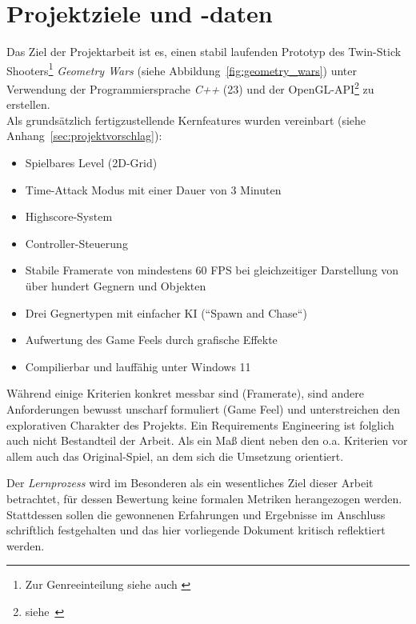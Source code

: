 \section{Projektziele und -daten}\label{sec:projektdaten}

Das Ziel der Projektarbeit ist es, einen stabil laufenden Prototyp des Twin-Stick Shooters\footnote{
Zur Genreeinteilung siehe auch \cite[]{GameDeveloper}
} \textit{Geometry Wars} (siehe Abbildung~\ref{fig:geometry_wars}) unter Verwendung der Programmiersprache \textit{C++} (23) und der OpenGL-API\footnote{siehe~\cite[]{OpenGLHomepage}
}  zu erstellen.\\

\noindent
Als grundsätzlich fertigzustellende Kernfeatures wurden vereinbart (siehe Anhang~\ref{sec:projektvorschlag}):

\vspace{2mm}
\begin{itemize}
    \itemsep0.5em
    \item Spielbares Level (2D-Grid)
    \item Time-Attack Modus mit einer Dauer von 3 Minuten
    \item Highscore-System
    \item Controller-Steuerung
    \item Stabile Framerate von mindestens 60 FPS bei gleichzeitiger Darstellung von über hundert Gegnern und Objekten
    \item Drei Gegnertypen mit einfacher KI (``Spawn and Chase``)
    \item Aufwertung des Game Feels durch grafische Effekte
    \item Compilierbar und lauffähig unter Windows 11
\end{itemize}
\vspace{2mm}

Während einige Kriterien konkret messbar sind (Framerate), sind andere Anforderungen bewusst unscharf formuliert (Game Feel) und unterstreichen den explorativen Charakter des Projekts.
Ein Requirements Engineering ist folglich auch nicht Bestandteil der Arbeit.
Als ein Maß dient neben den o.a. Kriterien vor allem auch das Original-Spiel, an dem sich die Umsetzung orientiert.\par

Der \textit{Lernprozess} wird im Besonderen als ein wesentliches Ziel dieser Arbeit betrachtet, für dessen Bewertung keine formalen Metriken herangezogen werden.
Stattdessen sollen die gewonnenen Erfahrungen und Ergebnisse im Anschluss schriftlich festgehalten und das hier vorliegende Dokument kritisch reflektiert werden.\par

